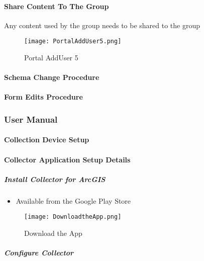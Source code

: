 \documentclass[class=book , crop=false, titlepage, twoside, multi={itemize, figure, verbatim}, float=false]{standalone}
\begin{document}
\paragraph[Share Portal Content]{\Large Share Content To The Group\texorpdfstring{\\}{}}
\vspace{.5in}

\noindent Any content used by the group needs to be shared to the group
\vspace{.5in}

%
%
\begin{figure}[h!]
\centering
    \texttt{[image: PortalAddUser5.png]}
\caption{Portal AddUser 5}
\end{figure}
\clearpage
%
%
%
\paragraph[Schema Change Procedure]{\Large Schema Change Procedure}
\clearpage
%
%
%
\paragraph[Form Edits Procedure]{\Large Form Edits Procedure}
\clearpage
%
%
%
\subsubsection[User Manual]{\Large User Manual}

\paragraph{Collection Device Setup}

\paragraph{Collector Application Setup Details}

\subparagraph{Install Collector for ArcGIS}
\begin{itemize}
\item Available from the Google Play Store
\end{itemize}
%
%
\begin{figure}[h!]
\centering
    \texttt{[image: DownloadtheApp.png]}
\caption{Download the App}
\end{figure}
\clearpage
%
%
%
\subparagraph[Configure Collector]{\Large Configure Collector}
\end{document}

